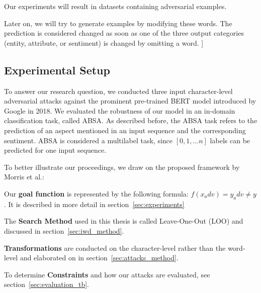 Our experiments will result in datasets containing adversarial examples.

Later on, we will try to generate examples by modifying these words.
The prediction is considered changed as soon as one of the three output categories (entity, attribute, or sentiment) is changed by omitting a word. ]


\subsection{Experimental Setup} 
To answer our research question, we conducted three input character-level adversarial attacks against the prominent pre-trained BERT model introduced by Google in 2018. 
We evaluated the robustness of our model in an in-domain classification task, called ABSA. As described before, the ABSA task refers to the prediction of an aspect mentioned in an input sequence and the corresponding sentiment. ABSA is considered a multilabel task, since $[0,1, \dots n]$ labels can be predicted for one input sequence. 

To better illustrate our proceedings, we draw on the proposed framework by Morris et al.:

Our \textbf{goal function} is represented by the following formula: ${f( x_adv ) = y_adv \neq y}$. It is described in more detail in section~\ref{sec:experiments}

The \textbf{Search Method} used in this thesis is called Leave-One-Out (LOO) and discussed in section~\ref{sec:iwd_method}.

\textbf{Transformations} are conducted on the character-level rather than the word-level and elaborated on in section~\ref{sec:attacks_method}.

To determine \textbf{Constraints} and how our attacks are evaluated, see section~\ref{sec:evaluation_tb}.


